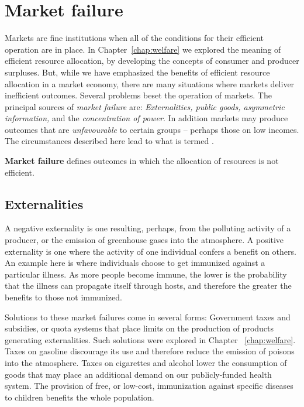 \section{Market failure}\label{sec:ch14sec1}

Markets are fine institutions when all of the conditions for their efficient
operation are in place. In Chapter~\ref{chap:welfare} we explored the
meaning of efficient resource allocation, by developing the concepts of
consumer and producer surpluses. But, while we have emphasized the benefits
of efficient resource allocation in a market economy, there are many
situations where markets deliver inefficient outcomes. Several problems
beset the operation of markets. The principal sources of \textit{market
	failure} are: \textit{Externalities, public goods, asymmetric information,}
and the \textit{concentration of power}. In addition markets may produce
outcomes that are \textit{unfavourable} to certain groups -- perhaps those
on low incomes. The circumstances described here lead to what is termed 
.

\begin{DefBox}
	\textbf{Market failure} defines outcomes in which the allocation of resources is not efficient.  
\end{DefBox}

\subsection*{Externalities}

A negative externality is one resulting, perhaps, from the polluting
activity of a producer, or the emission of greenhouse gases into the
atmosphere. A positive externality is one where the activity of one
individual confers a benefit on others. An example here is where individuals
choose to get immunized against a particular illness. As more people become
immune, the lower is the probability that the illness can propagate itself
through hosts, and therefore the greater the benefits to those not immunized.

Solutions to these market failures come in several forms: Government taxes
and subsidies, or quota systems that place limits on the production of
products generating externalities. Such solutions were explored in Chapter~%
\ref{chap:welfare}. Taxes on gasoline discourage its use and therefore
reduce the emission of poisons into the atmosphere. Taxes on cigarettes and
alcohol lower the consumption of goods that may place an additional demand
on our publicly-funded health system. The provision of free, or low-cost,
immunization against specific diseases to children benefits the whole
population.

